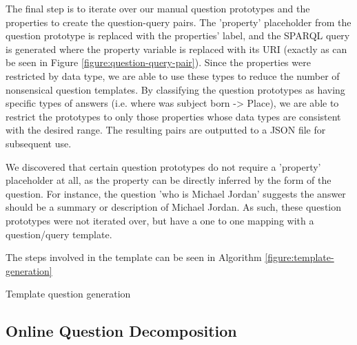 \documentclass[sigplan,screen]{acmart}
\begin{document}
The final step is to iterate over our manual question prototypes and the properties to create the question-query pairs. The '{property}' placeholder from the question prototype is replaced with the properties' label, and the SPARQL query is generated where the property variable is replaced with its URI (exactly as can be seen in Figure \ref{figure:question-query-pair}). Since the properties were restricted by data type, we are able to use these types to reduce the number of nonsensical question templates. By classifying the question prototypes as having specific types of answers (i.e. where was {subject} born -> Place), we are able to restrict the prototypes to only those properties whose data types are consistent with the desired range. The resulting pairs are outputted to a JSON file for subsequent use.

We discovered that certain question prototypes do not require a '{property}' placeholder at all, as the property can be directly inferred by the form of the question. For instance, the question 'who is Michael Jordan' suggests the answer should be a summary or description of Michael Jordan. As such, these question prototypes were not iterated over, but have a one to one mapping with a question/query template.

The steps involved in the template can be seen in Algorithm \ref{figure:template-generation}

\begin{algorithm}[h]
\SetAlgoLined
{}
 \caption{Template question generation}
 \label{algo:template-generation}
\end{algorithm}

\subsection{Online Question Decomposition}
\end{document}
